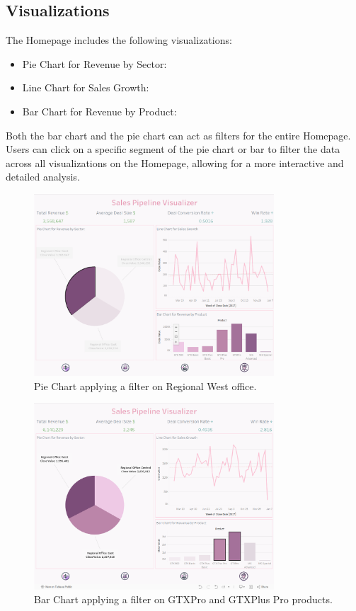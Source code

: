 \documentclass{article}
\begin{document}
\subsection{Visualizations}
The Homepage includes the following visualizations:
\begin{itemize}
    \item{Pie Chart for Revenue by Sector:}
    \item{Line Chart for Sales Growth:}
    \item{Bar Chart for Revenue by Product:}
\end{itemize}
Both the bar chart and the pie chart can act as filters for the entire Homepage. Users can click on a specific segment of the pie chart or bar to filter the data across all visualizations on the Homepage, allowing for a more interactive and detailed analysis.
\begin{figure}[h!]
    \centering
    \includegraphics[width=0.8\textwidth]{resources/swappy-20240527_141440.png}
    \caption{\scriptsize{Pie Chart applying a filter on Regional West office.}}
\end{figure}
\begin{figure}[h!]
    \centering
    \includegraphics[width=0.8\textwidth]{resources/swappy-20240527_141503.png}
    \caption{\scriptsize{Bar Chart applying a filter on GTXPro and GTXPlus Pro products.}}
\end{figure}
\end{document}
